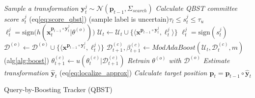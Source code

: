 \documentclass[10pt, conference, compsocconf]{IEEEtran}
\begin{document}
\begin{algorithm}[!t]
\DontPrintSemicolon
{}
\BlankLine
{}
{
\emph{Sample a transformation $\mathbf{y}_t^j \sim \mathcal{N}(\mathbf{p}_{t-1},\Sigma_{search})$}\;
\emph{Calculate QBST committee score $s_t^j$} (eq\eqref{eq:score_qbst})\;
\uIf(sample label is uncertain){$\tau_l \leq s_t^j \leq \tau_u$}
        {
        \emph{$\ell_t^j = \mathrm{sign} \big( h(\mathbf{x}_t^{\mathbf{p}_{t-1} \circ \mathbf{y}_t^j} | \theta^{(o)}) \big)$}\;
        \emph{$\mathcal{U}_t \leftarrow \mathcal{U}_t \cup \{\langle \mathbf{x}^{\mathbf{p}_{t-1} \circ \mathbf{y}^j_t} , \ell^j_t \rangle\}$}\;
        }
\Else
        {
        \emph{$\ell_t^j = \mathrm{sign} (s_t^j)$}\;
        }
\emph{$\mathcal{D}^{(o)} \leftarrow \mathcal{D}^{(o)} \cup \{\langle \mathbf{x}^{\mathbf{p}_{t-1} \circ \mathbf{y}^j_t} , \ell^j_t \rangle\}$}\;
}%
%
{
\emph{ $\mathcal{D}_{t+1}^{(c)},\beta_{t+1}^{(c)} \leftarrow ModAdaBoost (\mathcal{U}_t,\mathcal{D}_{t}^{(c)},m)$ }(alg\ref{alg:boost})\;
\emph{ $\theta_{t+1}^{(c)} \leftarrow u(\theta_t^{(c)}|\mathcal{D}_{t+1}^{(c)})$}\;
}
%
{
\emph{Retrain $\theta^{(o)}$ with $\mathcal{D}^{(o)}$}\;
}%
\emph{Estimate transformation $\mathbf{\hat{y}}_t$} (eq\eqref{eq:localize_approx}) \;
\emph{Calculate target position $\mathbf{p}_t = \mathbf{p}_{t-1} \circ \mathbf{\hat{y}}_t$}\;
\BlankLine
\caption{Query-by-Boosting Tracker (QBST)}
\label{alg:qbst}
\vspace{-0.1em}
\end{algorithm}
%
\newcommand\mycommfont[1]{\footnotesize\ttfamily\textcolor{black}{#1}}
\end{document}
